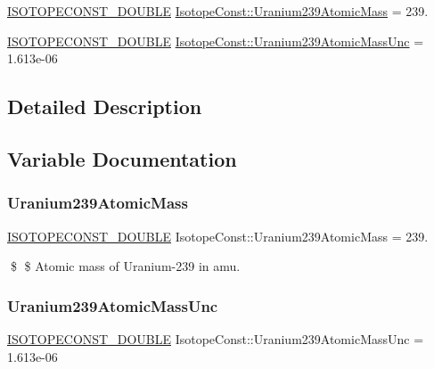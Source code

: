 \begin{DoxyCompactItemize}
\item 
\mbox{\hyperlink{group___isotope_const-_macros_ga8f45a7272ce02c0b4c65c44636ed719a}{I\+S\+O\+T\+O\+P\+E\+C\+O\+N\+S\+T\+\_\+\+D\+O\+U\+B\+LE}} \mbox{\hyperlink{group___isotope_const-_uranium-_u239_ga760e0a79598d480c0fb6aae19fa24ec0}{Isotope\+Const\+::\+Uranium239\+Atomic\+Mass}} = 239.
\item 
\mbox{\hyperlink{group___isotope_const-_macros_ga8f45a7272ce02c0b4c65c44636ed719a}{I\+S\+O\+T\+O\+P\+E\+C\+O\+N\+S\+T\+\_\+\+D\+O\+U\+B\+LE}} \mbox{\hyperlink{group___isotope_const-_uranium-_u239_gac8d0f472aee4272530d3657a14ca7259}{Isotope\+Const\+::\+Uranium239\+Atomic\+Mass\+Unc}} = 1.\+613e-\/06
\end{DoxyCompactItemize}


\subsection{Detailed Description}


\subsection{Variable Documentation}
\mbox{\label{group___isotope_const-_uranium-_u239_ga760e0a79598d480c0fb6aae19fa24ec0}} 
\subsubsection{\texorpdfstring{Uranium239\+Atomic\+Mass}{Uranium239AtomicMass}}
{\footnotesize\ttfamily \mbox{\hyperlink{group___isotope_const-_macros_ga8f45a7272ce02c0b4c65c44636ed719a}{I\+S\+O\+T\+O\+P\+E\+C\+O\+N\+S\+T\+\_\+\+D\+O\+U\+B\+LE}} Isotope\+Const\+::\+Uranium239\+Atomic\+Mass = 239.}

\$ \$ Atomic mass of Uranium-\/239 in amu. \mbox{\label{group___isotope_const-_uranium-_u239_gac8d0f472aee4272530d3657a14ca7259}} 
\subsubsection{\texorpdfstring{Uranium239\+Atomic\+Mass\+Unc}{Uranium239AtomicMassUnc}}
{\footnotesize\ttfamily \mbox{\hyperlink{group___isotope_const-_macros_ga8f45a7272ce02c0b4c65c44636ed719a}{I\+S\+O\+T\+O\+P\+E\+C\+O\+N\+S\+T\+\_\+\+D\+O\+U\+B\+LE}} Isotope\+Const\+::\+Uranium239\+Atomic\+Mass\+Unc = 1.\+613e-\/06}

